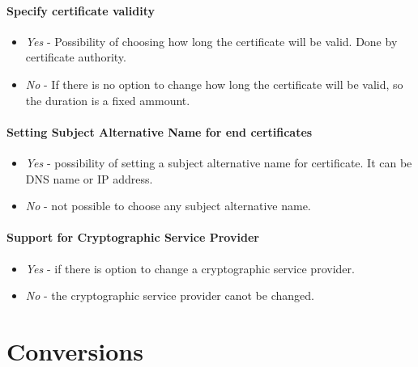 \documentclass[10pt, a4paper]{report}
\begin{document}
\paragraph{Specify certificate validity}

\begin{itemize}
 \item \textit{Yes} - Possibility of choosing how long the certificate will be valid. Done by certificate authority.
 \item \textit{No} - If there is no option to change how long the certificate will be valid, so the duration is a fixed ammount.
\end{itemize}

\paragraph{Setting Subject Alternative Name for end certificates}

\begin{itemize}
 \item \textit{Yes} - possibility of setting a subject alternative name for certificate. It can be DNS name or IP address.
 \item \textit{No} - not possible to choose any subject alternative name.
\end{itemize}

\paragraph{Support for Cryptographic Service Provider}
\begin{itemize}
 \item \textit{Yes} - if there is option to change a cryptographic service provider. 
 \item \textit{No} - the cryptographic service provider canot be changed.
\end{itemize}

\newpage

\section{Conversions}
\end{document}
